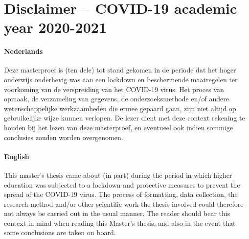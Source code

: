 \section*{Disclaimer – COVID-19 academic year 2020-2021}


\paragraph{Nederlands}
Deze masterproef is (ten dele) tot stand gekomen in de periode dat het hoger onderwijs onderhevig was aan een lockdown en beschermende maatregelen ter voorkoming van de verspreiding van
het COVID-19 virus. Het proces van opmaak, de verzameling van gegevens, de onderzoeksmethode en/of andere wetenschappelijke werkzaamheden die ermee gepaard gaan, zijn niet altijd
op gebruikelijke wijze kunnen verlopen. De lezer dient met deze context rekening te houden
bij het lezen van deze masterproef, en eventueel ook indien sommige conclusies zouden worden
overgenomen.


\paragraph{English}
This master’s thesis came about (in part) during the period in which higher education was subjected to a lockdown and protective measures to prevent the spread of the COVID-19 virus.
The process of formatting, data collection, the research method and/or other scientific work the
thesis involved could therefore not always be carried out in the usual manner. The reader should
bear this context in mind when reading this Master’s thesis, and also in the event that some
conclusions are taken on board.

\newpage